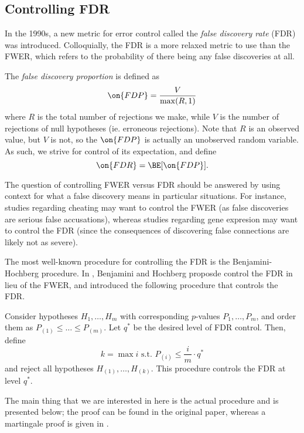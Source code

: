 \documentclass[11pt,reqno]{report}
\theoremstyle{definition}
\numberwithin{equation}{section}
\begin{document}
\subsection{Controlling FDR} 
In the 1990s, a new metric for error control called the \emph{false discovery rate} (FDR) was introduced. Colloquially, the FDR is a more relaxed metric to use than the FWER, which refers to the probability of there being any false discoveries at all.
\begin{defn}
The \emph{false discovery proportion} is defined as
\begin{equation}
\on{FDP} = \frac{V}{\max(R, 1)}
\end{equation}
where $R$ is the total number of rejections we make, while $V$ is the number of rejections of null hypotheses (ie. erroneous rejections). Note that $R$ is an observed value, but $V$ is not, so the $\on{FDP}$ is actually an unobserved random variable. As such, we strive for control of its expectation, and define
\begin{equation}
\on{FDR} = \BE[\on{FDP}].
\end{equation}

\end{defn}
The question of controlling FWER versus FDR should be answered by using context for what a false discovery means in particular situations. For instance, studies regarding cheating may want to control the FWER (as false discoveries are serious false accusations), whereas studies regarding gene expresion may want to control the FDR (since the consequences of discovering false connections are likely not as severe). 

The most well-known procedure for controlling the FDR is the Benjamini-Hochberg procedure. In \cite{bh}, Benjamini and Hochberg proposde control the FDR in lieu of the FWER, and introduced the following procedure that controls the FDR.
\begin{theorem}
Consider hypotheses $H_1, \ldots, H_m$ with corresponding $p$-values $P_1, \ldots, P_m$, and order them as $P_{(1)} \leq \ldots \leq P_{(m)}$. Let $q^*$ be the desired level of FDR control. Then, define
\[ k = \max i \text{ s.t. } P_{(i)} \leq \frac{i}{m} \cdot q^{*} \] and reject all hypotheses $H_{(1)}, \ldots, H_{(k)}$. This procedure controls the FDR at level $q^*$. 
\end{theorem}
The main thing that we are interested in here is the actual procedure and is presented below; the proof can be found in the original paper, whereas a martingale proof is given in \cite{stat300}.
\end{document}

